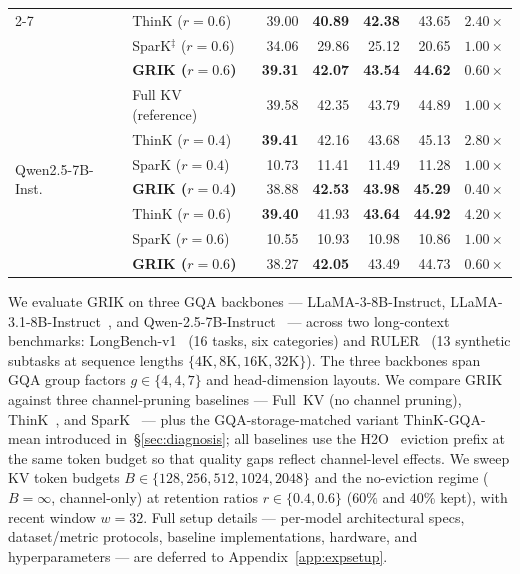 \documentclass{article}
\begin{document}
\begin{table}[t!]
\begin{tabular}{llrrrrr}
\cmidrule(lr){2-7}
& ThinK ($r{=}0.6$)                      & 39.00          & \textbf{40.89} & \textbf{42.38} & 43.65          & $2.40\times$ \\
& SparK$^\ddagger$ ($r{=}0.6$)           & 34.06          & 29.86          & 25.12          & 20.65          & $1.00\times$ \\
& \textbf{GRIK ($r{=}0.6$)}              & \textbf{39.31} & \textbf{42.07} & \textbf{43.54} & \textbf{44.62} & $\mathbf{0.60\times}$ \\
\midrule
\multirow{7}{*}{Qwen2.5-7B-Inst.}
& Full KV (reference)                    & 39.58          & 42.35          & 43.79          & 44.89          & $1.00\times$ \\
\cmidrule(lr){2-7}
& ThinK ($r{=}0.4$)                      & \textbf{39.41} & 42.16          & 43.68          & 45.13          & $2.80\times$ \\
& SparK ($r{=}0.4$)                      & 10.73          & 11.41          & 11.49          & 11.28          & $1.00\times$ \\
& \textbf{GRIK ($r{=}0.4$)}              & 38.88          & \textbf{42.53} & \textbf{43.98} & \textbf{45.29} & $\mathbf{0.40\times}$ \\
\cmidrule(lr){2-7}
& ThinK ($r{=}0.6$)                      & \textbf{39.40} & 41.93          & \textbf{43.64} & \textbf{44.92} & $4.20\times$ \\
& SparK ($r{=}0.6$)                      & 10.55          & 10.93          & 10.98          & 10.86          & $1.00\times$ \\
& \textbf{GRIK ($r{=}0.6$)}              & 38.27          & \textbf{42.05} & 43.49          & 44.73          & $\mathbf{0.60\times}$ \\
\bottomrule
\end{tabular}
\end{table}






We evaluate GRIK on three GQA backbones --- LLaMA-3-8B-Instruct, LLaMA-3.1-8B-Instruct~\citep{llama3}, and Qwen-2.5-7B-Instruct~\citep{qwen25} --- across two long-context benchmarks: LongBench-v1~\citep{longbench} (16 tasks, six categories) and RULER~\citep{ruler} (13 synthetic subtasks at sequence lengths $\{4\text{K}, 8\text{K}, 16\text{K}, 32\text{K}\}$). The three backbones span GQA group factors $g \in \{4, 4, 7\}$ and head-dimension layouts. We compare GRIK against three channel-pruning baselines --- Full~KV (no channel pruning), ThinK~\citep{think}, and SparK~\citep{spark} --- plus the GQA-storage-matched variant ThinK-GQA-mean introduced in~\S\ref{sec:diagnosis}; all baselines use the H2O~\citep{h2o} eviction prefix at the same token budget so that quality gaps reflect channel-level effects. We sweep KV token budgets $B \in \{128, 256, 512, 1024, 2048\}$ and the no-eviction regime ($B = \infty$, channel-only) at retention ratios $r \in \{0.4, 0.6\}$ ($60\%$ and $40\%$ kept), with recent window $w = 32$. Full setup details --- per-model architectural specs, dataset/metric protocols, baseline implementations, hardware, and hyperparameters --- are deferred to Appendix~\ref{app:expsetup}.
\end{document}
